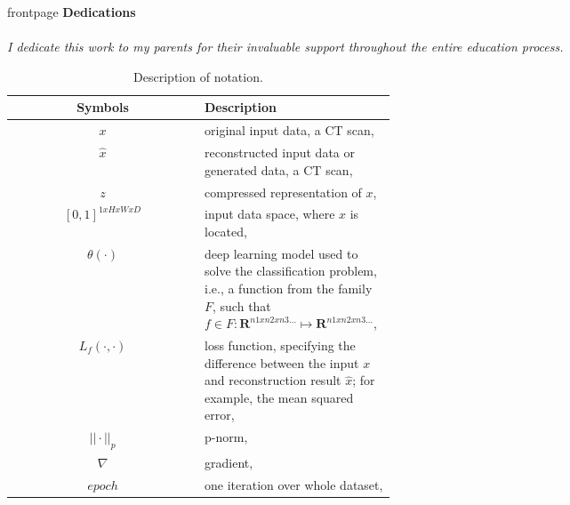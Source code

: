 


{frontpage} %
\newpage
\textbf{Dedications}\\\\
\textit{I dedicate this work to my parents for their invaluable support throughout the entire education process.}
\newpage
\tableofcontents %
\newpage
\begin{table}[h]
    \centering
    \begin{tabular}{|c|p{0.5\linewidth}|}
        \hline
        Symbols & Description\\
        \hline
        $x$ & original input data, a CT scan, \\
        $\hat{x}$ & reconstructed input data or generated data, a CT scan,\\
        $z$ & compressed representation of $x$,\\
        $[0,1]^{1xHxWxD}$ & input data space, where $x$ is located,\\
        $\theta(\cdot)$ & deep learning model used to solve the classification problem, i.e., a function from the family $F$, such that $f \in F: \mathbf{R}^{n1xn2xn3...} \mapsto \mathbf{R}^{n1xn2xn3...}$,\\
        $L_f(\cdot,\cdot)$ & loss function, specifying the difference between the input $x$ and reconstruction result $\hat{x}$; for example, the mean squared error,\\
        $||\cdot||_p$ & p-norm,\\
        $\nabla$ & gradient,\\
        $epoch$ & one iteration over whole dataset,\\
    \hline
    \end{tabular} 
    \caption{Description of notation.}
    \label{tab:notation_table}
\end{table}


